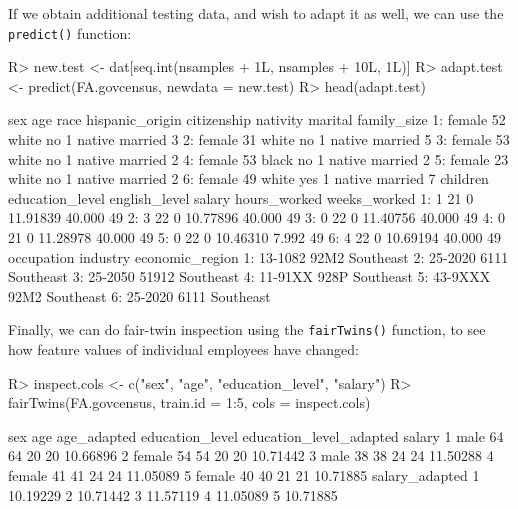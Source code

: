 \documentclass[
  notitle]{jss}
\begin{document}
If we obtain additional testing data, and wish to adapt it as well, we
can use the \texttt{predict()} function:

\begin{CodeChunk}
\begin{CodeInput}
R> new.test <- dat[seq.int(nsamples + 1L, nsamples + 10L, 1L)]
R> adapt.test <- predict(FA.govcensus, newdata = new.test)
R> head(adapt.test)
\end{CodeInput}
\begin{CodeOutput}
      sex age  race hispanic_origin citizenship nativity marital family_size
1: female  52 white              no           1   native married           3
2: female  31 white              no           1   native married           5
3: female  53 white              no           1   native married           2
4: female  53 black              no           1   native married           2
5: female  23 white              no           1   native married           2
6: female  49 white             yes           1   native married           7
   children education_level english_level   salary hours_worked weeks_worked
1:        1              21             0 11.91839       40.000           49
2:        3              22             0 10.77896       40.000           49
3:        0              22             0 11.40756       40.000           49
4:        0              21             0 11.28978       40.000           49
5:        0              22             0 10.46310        7.992           49
6:        4              22             0 10.69194       40.000           49
   occupation industry economic_region
1:    13-1082     92M2       Southeast
2:    25-2020     6111       Southeast
3:    25-2050    51912       Southeast
4:    11-91XX     928P       Southeast
5:    43-9XXX     92M2       Southeast
6:    25-2020     6111       Southeast
\end{CodeOutput}
\end{CodeChunk}

Finally, we can do fair-twin inspection using the \texttt{fairTwins()}
function, to see how feature values of individual employees have
changed:

\begin{CodeChunk}
\begin{CodeInput}
R> inspect.cols <- c("sex", "age", "education_level", "salary")
R> fairTwins(FA.govcensus, train.id = 1:5, cols = inspect.cols)
\end{CodeInput}
\begin{CodeOutput}
     sex age age_adapted education_level education_level_adapted   salary
1   male  64          64              20                      20 10.66896
2 female  54          54              20                      20 10.71442
3   male  38          38              24                      24 11.50288
4 female  41          41              24                      24 11.05089
5 female  40          40              21                      21 10.71885
  salary_adapted
1       10.19229
2       10.71442
3       11.57119
4       11.05089
5       10.71885
\end{CodeOutput}
\end{CodeChunk}
\end{document}
